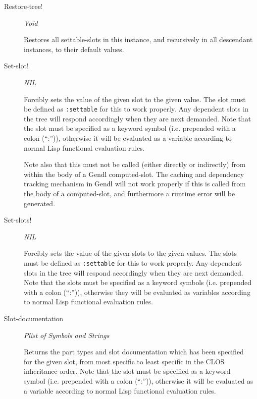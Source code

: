 \documentclass [11pt]{book}
\begin{document}
\begin{itemize}
\begin{description}
\item [Restore-tree!]
\emph{Void}

 Restores all settable-slots in this instance, and recursively in all descendant instances,
to their default values.




\item [Set-slot!]
\emph{NIL}

 Forcibly sets the value of the given slot to the given value. The slot must be defined
as \texttt{:settable} for this to work properly. Any dependent slots in the tree will
respond accordingly when they are next demanded. Note that the slot must be specified as a keyword
symbol (i.e. prepended with a colon (``:'')), otherwise it will be evaluated as a variable according
to normal Lisp functional evaluation rules.



Note also that this must not be called (either directly or indirectly)
from within the body of a Gendl computed-slot. The caching and
dependency tracking mechanism in Gendl will not work properly if this
is called from the body of a computed-slot, and furthermore a runtime
error will be generated.






\item [Set-slots!]
\emph{NIL}

 Forcibly sets the value of the given slots to the given values. The slots must be defined
as \texttt{:settable} for this to work properly. Any dependent slots in the tree will
respond accordingly when they are next demanded. Note that the slots must be specified as a keyword
symbols (i.e. prepended with a colon (``:'')), otherwise they will be evaluated as variables according
to normal Lisp functional evaluation rules.




\item [Slot-documentation]
\emph{Plist of Symbols and Strings}

 Returns the part types and slot documentation which has been
specified for the given slot, from most specific to least specific in the CLOS inheritance order.
Note that the slot must be specified as a keyword symbol (i.e. prepended with a colon (``:'')),
otherwise it will be evaluated as a variable according to normal Lisp functional evaluation rules.





\end{description}
\end{itemize}
\end{document}
